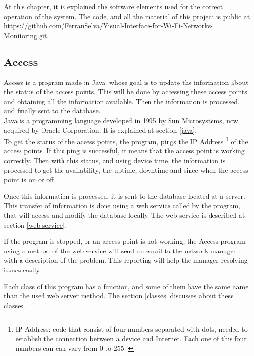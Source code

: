 \documentclass[12pt, a4paper,twoside]{tesi_upf}
\begin{document}
    At this chapter, it is explained the software elements used for the correct operation of the system. The code, and all the material of this project is public at \url{https://github.com/FerranSelva/Visual-Interface-for-Wi-Fi-Networks-Monitoring.git}.
    
        \subsection{Access}
        \label{access}
        
      Access is a program made in Java, whose goal is to update the information about the status of the access points. This will be done by accessing these access points and obtaining all the information available. Then the information is processed, and finally sent to the database. \\
        
        Java is a programming language developed in 1995 by Sun Microsystems, now acquired by Oracle Corporation. It is explained at section \ref{java}.\\
        
        To get the status of the access points, the program, pings the IP Address \footnote{IP Address: code that consist of four numbers separated with dots, needed to establish the connection between a device and Internet. Each one of this four numbers can can vary from 0 to 255 \cite{ipa}.} of the access points. If this ping is successful, it means that the access point is working correctly. Then with this status, and using device time, the information is processed to get the availability, the uptime, downtime and since when the access point is on or off. 
        
        Once this information is processed, it is sent to the database located at a server. This transfer of information is done using a web service called by the program, that will access and modify the database locally. The web service is described at section \ref{web service}.
        
If the program is stopped, or an access point is not working, the Access program using a method of the web service will send an email to the network manager with a description of the problem. This reporting will help the manager resolving issues easily.
        
        Each class of this program has a function, and some of them have the same name than the used web server method. The section \ref{classes} discusses about these classes.\\
        
\end{document}
